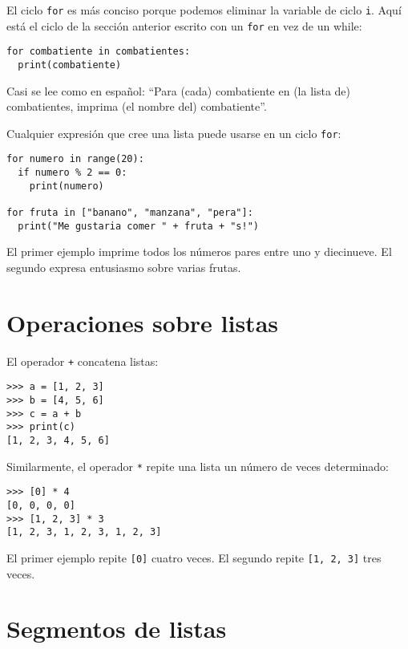 El ciclo \texttt{for} es más conciso porque podemos eliminar la variable
de ciclo \texttt{i}. Aquí está el ciclo de la sección anterior escrito
con un \texttt{for} en vez de un while: 
\begin{lstlisting}
for combatiente in combatientes:
  print(combatiente)
\end{lstlisting}

Casi se lee como en español: ``Para (cada) combatiente en (la lista
de) combatientes, imprima (el nombre del) combatiente''.

Cualquier expresión que cree una lista puede usarse en un ciclo \texttt{for}:
\begin{lstlisting}
for numero in range(20):
  if numero % 2 == 0:
    print(numero)

for fruta in ["banano", "manzana", "pera"]:
  print("Me gustaria comer " + fruta + "s!")
\end{lstlisting}

El primer ejemplo imprime todos los números pares entre uno y diecinueve.
El segundo expresa entusiasmo sobre varias frutas.

\section{Operaciones sobre listas}

 

El operador \texttt{+} concatena listas:

\begin{lstlisting}
>>> a = [1, 2, 3]
>>> b = [4, 5, 6]
>>> c = a + b
>>> print(c)
[1, 2, 3, 4, 5, 6]
\end{lstlisting}

Similarmente, el operador \texttt{{*}} repite una lista un número
de veces determinado:

\begin{lstlisting}
>>> [0] * 4
[0, 0, 0, 0]
>>> [1, 2, 3] * 3
[1, 2, 3, 1, 2, 3, 1, 2, 3]
\end{lstlisting}

El primer ejemplo repite \texttt{{[}0{]}} cuatro veces. El segundo
repite \texttt{{[}1, 2, 3{]}} tres veces.

\section{Segmentos de listas}


